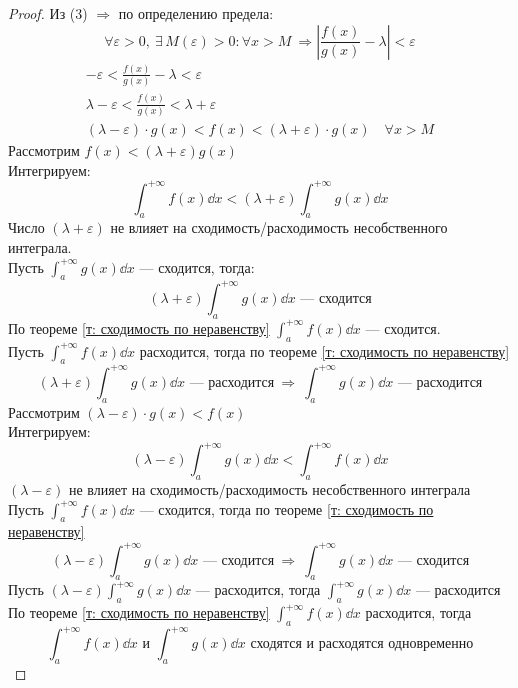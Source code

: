 \begin{proof}
    Из (3) $\Rightarrow$ по определению предела:
    \[ \forall \varepsilon > 0,\ \exists\, M(\varepsilon) > 0\colon \forall x > M\ \Rightarrow \left| \frac{f(x)}{g(x)} - \lambda \right| < \varepsilon \] \vspace{-\topsep}
    \begin{gather*}
        -\varepsilon < \frac{f(x)}{g(x)} - \lambda < \varepsilon\\
        \lambda - \varepsilon < \frac{f(x)}{g(x)} < \lambda + \varepsilon\\
        (\lambda - \varepsilon)\cdot g(x) < f(x) < (\lambda + \varepsilon)\cdot g(x)\quad \forall x > M \tag{$*$}
    \end{gather*}
     Рассмотрим $f(x) < (\lambda + \varepsilon) g(x)$\\
    Интегрируем:
    \[ 
        \int_{a}^{+\infty} f(x)\dd{x} < (\lambda + \varepsilon) \int_{a}^{+\infty} g(x)\dd{x}
    \]
    Число $(\lambda + \varepsilon)$ не влияет на сходимость/расходимость несобственного интеграла.\\[1ex]
    Пусть $\int_{a}^{+\infty} g(x)\dd{x}$ --- сходится, тогда:
    \[
        (\lambda + \varepsilon) \int_{a}^{+\infty}g(x)\dd{x} \text{ --- сходится}
    \]
    По теореме \ref{т: сходимость по неравенству} $\int_{a}^{+\infty} f(x)\dd{x}$ --- сходится.\\[1ex]
    Пусть $\int_{a}^{+\infty} f(x)\dd{x}$ расходится, тогда по теореме \ref{т: сходимость по неравенству}
    \[
        (\lambda + \varepsilon) \int_{a}^{+\infty}g(x)\dd{x} \text{ --- расходится}\ \Rightarrow\ \int_{a}^{+\infty} g(x)\dd{x} \text{ --- расходится}
    \]
     Рассмотрим $(\lambda - \varepsilon)\cdot g(x) < f(x)$\\
    Интегрируем:
    \[
        (\lambda - \varepsilon) \int_{a}^{+\infty} g(x)\dd{x} < \int_{a}^{+\infty} f(x)\dd{x}
    \]
    $(\lambda - \varepsilon)$ не влияет на сходимость/расходимость несобственного интеграла\\[1ex]
    Пусть $\int_{a}^{+\infty} f(x)\dd{x}$ --- сходится, тогда по теореме \ref{т: сходимость по неравенству} \[
        (\lambda - \varepsilon)\int_{a}^{+\infty} g(x)\dd{x} \text{ --- сходится}\ \Rightarrow\ \int_{a}^{+\infty} g(x)\dd{x} \text{ --- сходится}
    \]
    Пусть $(\lambda - \varepsilon) \int_{a}^{+\infty} g(x)\dd{x}$ --- расходится, тогда $\int_{a}^{+\infty} g(x)\dd{x}$ --- расходится\\[1ex]
    По теореме \ref{т: сходимость по неравенству} $\int_{a}^{+\infty} f(x)\dd{x}$ расходится, тогда
    \[
        \int_{a}^{+\infty} f(x)\dd{x} \text{ и } \int_{a}^{+\infty} g(x)\dd{x} \text{ сходятся и расходятся одновременно}
    \]
\end{proof}

